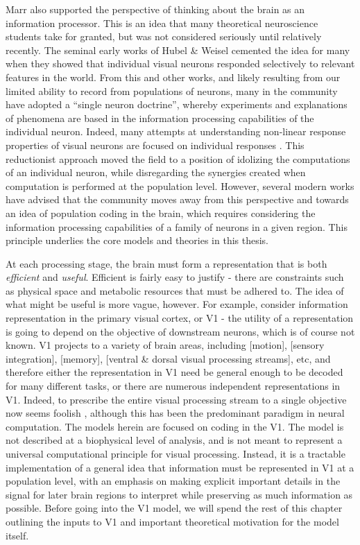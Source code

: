 Marr also supported the perspective of thinking about the brain as an information processor. This is an idea that many theoretical neuroscience students take for granted, but was not considered seriously until relatively recently. The seminal early works of Hubel \& Weisel \citeyearpar{hubel1959receptive} cemented the idea for many when they showed that individual visual neurons responded selectively to relevant features in the world. From this and other works, and likely resulting from our limited ability to record from populations of neurons, many in the community have adopted a ``single neuron doctrine'', whereby experiments and explanations of phenomena are based in the information processing capabilities of the individual neuron. Indeed, many attempts at understanding non-linear response properties of visual neurons are focused on individual responses \parencite{priebe2012mechanisms}. This reductionist approach moved the field to a position of idolizing the computations of an individual neuron, while disregarding the synergies created when computation is performed at the population level. However, several modern works have advised that the community moves away from this perspective \parencite{barlow1972single, olshausen1999probabilistic, zetzsche1999atoms, series2003silent} and towards an idea of population coding in the brain, which requires considering the information processing capabilities of a family of neurons in a given region. This principle underlies the core models and theories in this thesis.

At each processing stage, the brain must form a representation that is both \textit{efficient} and \textit{useful}. Efficient is fairly easy to justify - there are constraints such as physical space and metabolic resources that must be adhered to. The idea of what might be useful is more vague, however. For example, consider information representation in the primary visual cortex, or V1 - the utility of a representation is going to depend on the objective of downstream neurons, which is of course not known. V1 projects to a variety of brain areas, including [motion], [sensory integration], [memory], [ventral \& dorsal visual processing streams], etc, and therefore either the representation in V1 need be general enough to be decoded for many different tasks, or there are numerous independent representations in V1. Indeed, to prescribe the entire visual processing stream to a single objective now seems foolish \parencite{barlow2001redundancy}, although this has been the predominant paradigm in neural computation. The models herein are focused on coding in the V1. The model is not described at a biophysical level of analysis, and is not meant to represent a universal computational principle for visual processing. Instead, it is a tractable implementation of a general idea that information must be represented in V1 at a population level, with an emphasis on making explicit important details in the signal for later brain regions to interpret while preserving as much information as possible. Before going into the V1 model, we will spend the rest of this chapter outlining the inputs to V1 and important theoretical motivation for the model itself.


